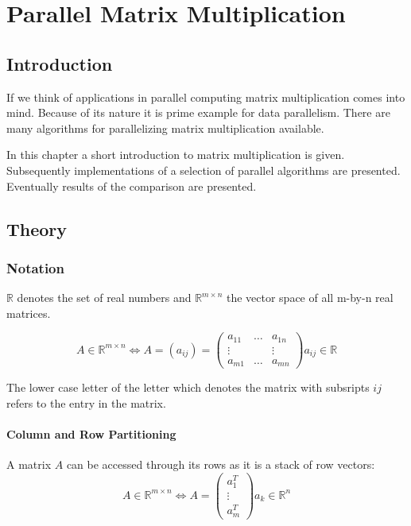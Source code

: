 \chapter{Parallel Matrix Multiplication}
\label{chap:matrix}
\section{Introduction}

If we think of applications in parallel computing matrix
multiplication comes into mind. Because of its nature it is prime
example for data parallelism. There are many algorithms for
parallelizing matrix multiplication available.


In this chapter a short introduction to matrix multiplication is
given. Subsequently implementations of a selection of parallel
algorithms are presented. Eventually results of the comparison are
presented.


\section{Theory}

\subsection{Notation}

$ \mathbb{R} $ denotes the set of real numbers and $ \mathbb{R}^{m
  \times n} $ the vector space of all m-by-n real matrices.

$$ A \in \mathbb{R}^{m \times n} \Longleftrightarrow A = (a_{ij}) = 
\left( \begin{array}{ccc}
a_{11} & \ldots & a_{1n} \\
\vdots &        & \vdots \\
a_{m1} & \ldots & a_{mn}
\end{array} \right)
a_{ij} \in \mathbb{R}
 $$

The lower case letter of the letter which denotes the matrix with
subsripts $ij$ refers to the entry in the matrix. 

\subsubsection{Column and Row Partitioning}

A matrix $A$ can be accessed through its rows as it is a stack of row
vectors:
$$ A \in \mathbb{R}^{m \times n} \Longleftrightarrow A = 
\left( \begin{array}{c}
a_{1}^T \\
\vdots \\
a_{m}^T 
\end{array} \right)
a_{k} \in \mathbb{R}^n 
 $$

